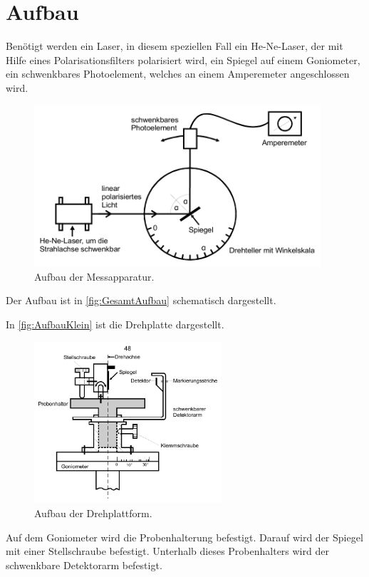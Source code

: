 \section{Aufbau}

\label{sec:Aufbau}
Benötigt werden ein Laser, in diesem speziellen Fall ein He-Ne-Laser, der mit Hilfe eines Polarisationsfilters polarisiert wird, ein Spiegel auf einem Goniometer, ein schwenkbares Photoelement, welches an einem Amperemeter angeschlossen wird. 
\begin{figure}
    \centering
    \includegraphics[height = 6cm]{GesamtAufbau.pdf}
    \caption{Aufbau der Messapparatur\cite{ap407}.}
    \label{fig:GesamtAufbau}
\end{figure}
Der Aufbau ist in \autoref{fig:GesamtAufbau} schematisch dargestellt.

In \autoref{fig:AufbauKlein} ist die Drehplatte dargestellt.
\begin{figure}
    \centering
    \includegraphics[height = 6cm]{AufbauKlein.pdf}
    \caption{Aufbau der Drehplattform\cite{ap407}.}
    \label{fig:AufbauKlein}
\end{figure}
Auf dem Goniometer wird die Probenhalterung befestigt. Darauf wird der Spiegel mit einer Stellschraube befestigt. Unterhalb dieses Probenhalters wird der schwenkbare Detektorarm befestigt.
